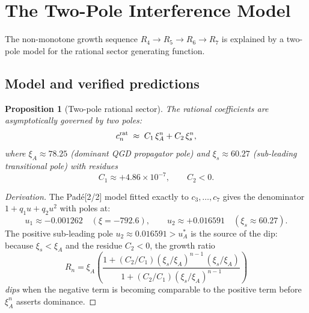 \documentclass[11pt,a4paper]{article}
\theoremstyle{plain}
\newtheorem{proposition}[theorem]{Proposition}
\theoremstyle{definition}
\theoremstyle{remark}
\newcommand{\uA}{u_A^*}
\newcommand{\xiA}{\xi_A}
\begin{document}
\section{The Two-Pole Interference Model}
\label{sec:twopole}

The non-monotone growth sequence $R_4 \to R_5 \to R_6 \to R_7$ is explained
by a two-pole model for the rational sector generating function.

\subsection{Model and verified predictions}

\begin{proposition}[Two-pole rational sector]\label{prop:twopole}
The rational coefficients are asymptotically governed by two poles:
\begin{equation}
  c_n^{\rm rat} \;\approx\; C_1\,\xiA^n + C_2\,\xi_s^n,
  \label{eq:twopole}
\end{equation}
where $\xiA \approx 78.25$ (dominant QGD propagator pole) and
$\xi_s \approx 60.27$ (sub-leading transitional pole) with residues
\begin{equation}
  C_1 \approx +4.86\times10^{-7},\qquad C_2 < 0.
  \label{eq:residues}
\end{equation}
\end{proposition}

\begin{proof}[Derivation]
The Pad\'e[2/2] model fitted exactly to $c_3,\ldots,c_7$ gives the denominator
$1 + q_1 u + q_2 u^2$ with poles at:
\begin{equation}
  u_1 \approx -0.001262 \quad(\xi = -792.6),\qquad
  u_2 \approx +0.016591 \quad(\xi_s \approx 60.27).
  \label{eq:pade22_poles}
\end{equation}
The positive sub-leading pole $u_2 \approx 0.016591 > \uA$ is the source of the dip:
because $\xi_s < \xiA$ and the residue $C_2 < 0$, the growth ratio
\begin{equation}
  R_n = \xiA\left(\frac{1 + (C_2/C_1)(\xi_s/\xiA)^{n-1}\,(\xi_s/\xiA)}{1 + (C_2/C_1)(\xi_s/\xiA)^{n-1}}\right)
\end{equation}
\emph{dips} when the negative term is becoming comparable to the positive term
before $\xiA^n$ asserts dominance.
\end{proof}
\end{document}
